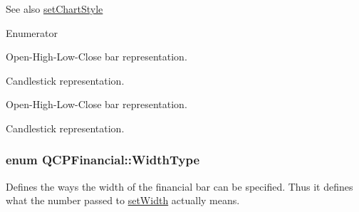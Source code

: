 \begin{DoxySeeAlso}{See also}
\hyperlink{class_q_c_p_financial_a5a59175d36279d71596e64d7bb65596f}{set\+Chart\+Style} 
\end{DoxySeeAlso}
\begin{Desc}
\item[Enumerator]\par
\begin{description}
\item[{\em 
cs\+Ohlc\hypertarget{class_q_c_p_financial_a0f800e21ee98d646dfc6f8f89d10ebfba3acf5bf7e9047684023e3236755768de}{}\label{class_q_c_p_financial_a0f800e21ee98d646dfc6f8f89d10ebfba3acf5bf7e9047684023e3236755768de}
}]Open-\/\+High-\/\+Low-\/\+Close bar representation. \item[{\em 
cs\+Candlestick\hypertarget{class_q_c_p_financial_a0f800e21ee98d646dfc6f8f89d10ebfba70109b20d14e2ff148fdbd500902e567}{}\label{class_q_c_p_financial_a0f800e21ee98d646dfc6f8f89d10ebfba70109b20d14e2ff148fdbd500902e567}
}]Candlestick representation. \item[{\em 
cs\+Ohlc\hypertarget{class_q_c_p_financial_a0f800e21ee98d646dfc6f8f89d10ebfba3acf5bf7e9047684023e3236755768de}{}\label{class_q_c_p_financial_a0f800e21ee98d646dfc6f8f89d10ebfba3acf5bf7e9047684023e3236755768de}
}]Open-\/\+High-\/\+Low-\/\+Close bar representation. \item[{\em 
cs\+Candlestick\hypertarget{class_q_c_p_financial_a0f800e21ee98d646dfc6f8f89d10ebfba70109b20d14e2ff148fdbd500902e567}{}\label{class_q_c_p_financial_a0f800e21ee98d646dfc6f8f89d10ebfba70109b20d14e2ff148fdbd500902e567}
}]Candlestick representation. \end{description}
\end{Desc}
\subsubsection[{\texorpdfstring{Width\+Type}{WidthType}}]{\setlength{\rightskip}{0pt plus 5cm}enum {\bf Q\+C\+P\+Financial\+::\+Width\+Type}}\hypertarget{class_q_c_p_financial_aef1761dda71a53dc5269685e9e492626}{}\label{class_q_c_p_financial_aef1761dda71a53dc5269685e9e492626}
Defines the ways the width of the financial bar can be specified. Thus it defines what the number passed to \hyperlink{class_q_c_p_financial_a99633f8bac86a61d534ae5eeb1a3068f}{set\+Width} actually means.

